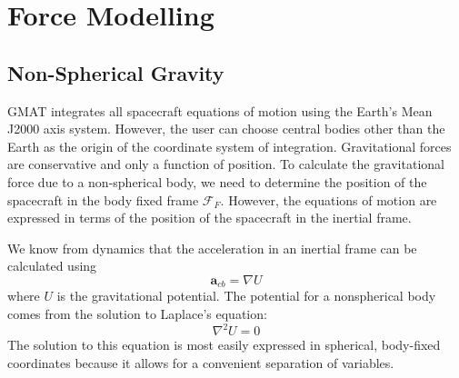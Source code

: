 \section{Force Modelling}

\subsection{Non-Spherical Gravity }

GMAT integrates all spacecraft equations of motion using the
Earth's Mean J2000 axis system. However, the user can choose
central bodies other than the Earth as the origin of the
coordinate system of integration.  Gravitational forces are
conservative and only a function of position.  To calculate the
gravitational force due to a non-spherical body, we need to
determine the position of the spacecraft in the body fixed frame
$\mathcal{F}_F$.  However, the equations of motion are expressed
in terms of the position of the spacecraft in the inertial frame.



We know from dynamics that the acceleration in an inertial frame
can be calculated using
%
\begin{equation}
   \mathbf{a}_{cb} = \nabla U \label{Eq:a_cb}
\end{equation}
%
where $U$ is the gravitational potential.  The potential for a
nonspherical body comes from the solution to Laplace's equation:
%
\begin{equation}
     \nabla^2 U= 0
\end{equation}
%
The solution to this equation is most easily expressed in spherical,
body-fixed coordinates because it allows for a convenient separation
of variables.

